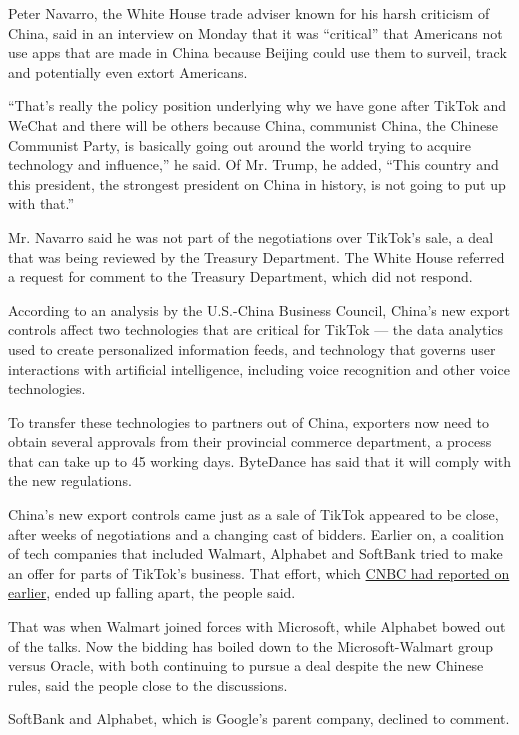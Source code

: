 Peter Navarro, the White House trade adviser known for his harsh
criticism of China, said in an interview on Monday that it was
``critical'' that Americans not use apps that are made in China because
Beijing could use them to surveil, track and potentially even extort
Americans.

``That's really the policy position underlying why we have gone after
TikTok and WeChat and there will be others because China, communist
China, the Chinese Communist Party, is basically going out around the
world trying to acquire technology and influence,'' he said. Of Mr.
Trump, he added, ``This country and this president, the strongest
president on China in history, is not going to put up with that.''

Mr. Navarro said he was not part of the negotiations over TikTok's sale,
a deal that was being reviewed by the Treasury Department. The White
House referred a request for comment to the Treasury Department, which
did not respond.

According to an analysis by the U.S.-China Business Council, China's new
export controls affect two technologies that are critical for TikTok ---
the data analytics used to create personalized information feeds, and
technology that governs user interactions with artificial intelligence,
including voice recognition and other voice technologies.

To transfer these technologies to partners out of China, exporters now
need to obtain several approvals from their provincial commerce
department, a process that can take up to 45 working days. ByteDance has
said that it will comply with the new regulations.

China's new export controls came just as a sale of TikTok appeared to be
close, after weeks of negotiations and a changing cast of bidders.
Earlier on, a coalition of tech companies that included Walmart,
Alphabet and SoftBank tried to make an offer for parts of TikTok's
business. That effort, which
\href{https://www.cnbc.com/2020/08/27/walmart-wanted-majority-tiktok-stake-teamed-with-alphabet-softbank.html}{CNBC
had reported on earlier}, ended up falling apart, the people said.

That was when Walmart joined forces with Microsoft, while Alphabet bowed
out of the talks. Now the bidding has boiled down to the
Microsoft-Walmart group versus Oracle, with both continuing to pursue a
deal despite the new Chinese rules, said the people close to the
discussions.

SoftBank and Alphabet, which is Google's parent company, declined to
comment.

